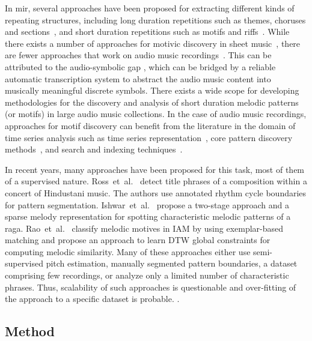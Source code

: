 In \gls{mir}, several approaches have been proposed for extracting different kinds of repeating structures, including long duration repetitions such as themes, choruses and sections~\cite{paulus2010state}, and short duration repetitions such as motifs and riffs~\cite{Janssen2013}. While there exists a number of approaches for motivic discovery in sheet music~\cite{Lartillot2005}, there are fewer approaches that work on audio music recordings~\cite{dannenberg2003pattern}. This can be attributed to the audio-symbolic gap \cite{collins2014bridging}, which can be bridged by a reliable automatic transcription system to abstract the audio music content into musically meaningful discrete symbols. There exists a wide scope for developing methodologies for the discovery and analysis of short duration melodic patterns (or motifs) in large audio music collections. In the case of audio music recordings, approaches for motif discovery can benefit from the literature in the domain of time series analysis such as time series representation~\cite{Lin2003}, core pattern discovery methods~\cite{Mueen2009}, and search and indexing techniques~\cite{Rakthanmanon2013}.

In recent years, many approaches have been proposed for this task, most of them of a supervised nature.  Ross~et~al.~\cite{Ross2012b} detect title phrases of a composition within a concert of Hindustani music. The authors use annotated rhythm cycle boundaries for pattern segmentation. Ishwar~et~al.~\cite{Ishwar2013} propose a two-stage approach and a sparse melody representation for spotting characteristic melodic patterns of a \gls{raga}. Rao~et~al.~\cite{Rao2014} classify melodic motives in IAM by using exemplar-based matching and propose an approach to learn DTW global constraints for computing melodic similarity. Many of these approaches either use semi-supervised pitch estimation, manually segmented pattern boundaries, a dataset comprising few recordings, or analyze only a limited number of characteristic phrases. Thus, scalability of such approaches is questionable and over-fitting of the approach to a specific dataset is probable. .




\subsection{Method}
\label{sec:patterns_discovery_method}

